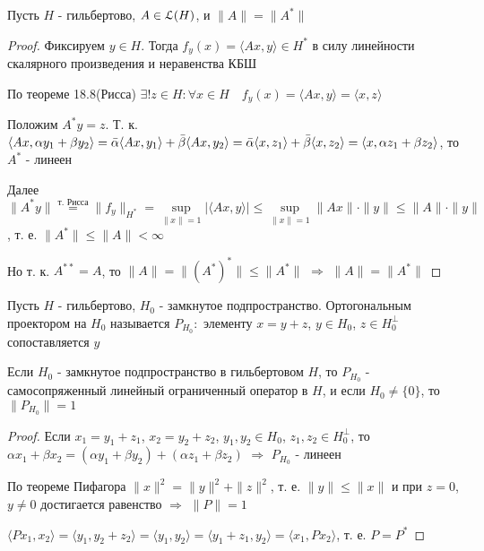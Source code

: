 \documentclass[a4paper,12pt]{report}
\newcommand*{\hm}[1]{#1\nobreak\discretionary{}%
            {\hbox{$\mathsurround=0pt #1$}}{}}
\begin{document}
\begin{thm}
Пусть $H$ - гильбертово, $A\in\EuScript L(H)$, и $\|A\|=\|A^*\|$
\end{thm}
\begin{proof}
Фиксируем $y\in H$. Тогда $f_y(x)=\langle Ax,y\rangle\in H^*$ в силу линейности скалярного произведения и неравенства КБШ

По теореме 18.8(Рисса) $\exists!z\in H\colon\forall x\in H\quad f_y(x)=\langle Ax,y\rangle=\langle x,z\rangle$

Положим $A^*y=z$. Т. к. $\langle Ax,\alpha y_1+\beta y_2\rangle=\bar\alpha\langle Ax,y_1\rangle+\bar\beta\langle Ax,y_2\rangle\hm=\bar\alpha\langle x,z_1\rangle+\bar\beta\langle x,z_2\rangle=\langle x,\alpha z_1+\beta z_2\rangle$, то $A^*$ - линеен

Далее $\|A^*y\|\stackrel{\text{т. Рисса}}{=}\|f_y\|_{H^*}=\sup\limits_{\|x\|=1}|\langle Ax,y\rangle|\le\sup\limits_{\|x\|=1}\|Ax\|\cdot\|y\|\le\|A\|\cdot\|y\|$, т. е. $\|A^*\|\le\|A\|<\infty$

Но т. к. $A^{**}=A$, то $\|A\|=\|(A^*)^*\|\le\|A^*\|$ $\Rightarrow$ $\|A\|=\|A^*\|$
\end{proof}
 


\begin{df}
Пусть $H$ - гильбертово, $H_0$ - замкнутое подпространство. Ортогональным проектором на $H_0$ называется $P_{H_0}\colon$ элементу $x=y+z$, $y\in H_0$, $z\in H_0^\perp$ сопоставляется $y$
\end{df}
 


\begin{prop}
Если $H_0$ - замкнутое подпространство в гильбертовом $H$, то $P_{H_0}$ - самосопряженный линейный ограниченный оператор в $H$, и если $H_0\ne\{0\}$, то $\|P_{H_0}\|=1$
\end{prop}
\begin{proof}
Если $x_1=y_1+z_1$, $x_2=y_2+z_2$, $y_1,y_2\in H_0$, $z_1,z_2\in H_0^\perp$, то $\alpha x_1+\beta x_2=(\alpha y_1+\beta y_2)+(\alpha z_1+\beta z_2)$ $\Rightarrow$ $P_{H_0}$ - линеен

По теореме Пифагора $\|x\|^2=\|y\|^2+\|z\|^2$, т. е. $\|y\|\le\|x\|$ и при $z=0$, $y\ne0$ достигается равенство $\Rightarrow$ $\|P\|=1$

\noindent$\langle P x_1,x_2\rangle=\langle y_1,y_2+z_2\rangle=\langle y_1,y_2\rangle=\langle y_1+z_1,y_2\rangle=\langle x_1,Px_2\rangle$, т. е. $P=P^*$
\end{proof}
\end{document}
